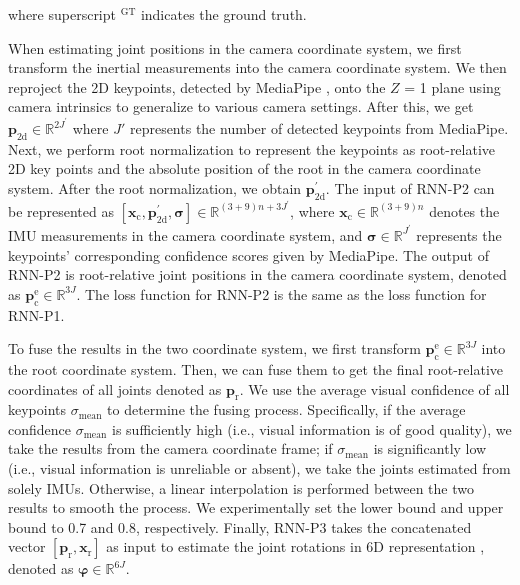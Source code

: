 where superscript $^{\mathrm{GT}}$ indicates the ground truth.
%
\par
When estimating joint positions in the camera coordinate system, we first transform the inertial measurements into the camera coordinate system.
%
We then reproject the 2D keypoints, detected by MediaPipe \cite{mediapipe}, onto the $Z$ = 1 plane using camera intrinsics to generalize to various camera settings.
%
After this, we get $\boldsymbol{p}_{\mathrm{2d}}\in\mathbb{R}^{2J^{'}}$ where $J'$ represents the number of detected keypoints from MediaPipe.
%
Next, we perform root normalization to represent the keypoints as root-relative 2D key points and the absolute position of the root in the camera coordinate system.
%
After the root normalization, we obtain $\boldsymbol{p}_{\mathrm{2d}}^{'}$.
%
The input of RNN-P2 can be represented as $[\boldsymbol{x}_{\mathrm{c}},\boldsymbol{p}_{\mathrm{2d}}^{'},\boldsymbol{\sigma}]\in\mathbb{R}^{(3+9)n+3J^{'}}$, where $\boldsymbol{x}_{\mathrm{c}}\in\mathbb{R}^{(3+9)n}$ denotes the IMU measurements in the camera coordinate system, and $\boldsymbol{\sigma}\in\mathbb{R}^{J^{'}}$ represents the keypoints' corresponding confidence scores given by MediaPipe.
%
The output of RNN-P2 is root-relative joint positions in the camera coordinate system, denoted as $\boldsymbol{p}_{\mathrm{c}}^{\mathrm{e}}\in\mathbb{R}^{3J}$.
%
The loss function for RNN-P2 is the same as the loss function for RNN-P1.
%
\par
To fuse the results in the two coordinate system, we first transform $\boldsymbol{p}_{\mathrm{c}}^{\mathrm{e}}\in\mathbb{R}^{3J}$ into the root coordinate system.
%
Then, we can fuse them to get the final root-relative coordinates of all joints denoted as $\boldsymbol{p}_{\mathrm{r}}$.
%
We use the average visual confidence of all keypoints $\sigma_{\mathrm{mean}}$ to determine the fusing process.
%
Specifically, if the average confidence $\sigma_{\mathrm{mean}}$ is sufficiently high (i.e., visual information is of good quality), we take the results from the camera coordinate frame;
%
if $\sigma_{\mathrm{mean}}$ is significantly low (i.e., visual information is unreliable or absent), we take the joints estimated from solely IMUs.
%
Otherwise, a linear interpolation is performed between the two results to smooth the process.
%
We experimentally set the lower bound and upper bound to 0.7 and 0.8, respectively.
%
Finally, RNN-P3 takes the concatenated vector $[\boldsymbol{p}_{\mathrm{r}},\boldsymbol{x}_{\mathrm{r}}]$ as input to estimate the joint rotations in 6D representation \cite{zhou2019continuity}, denoted as $\boldsymbol{\varphi}\in\mathbb{R}^{6J}$.
